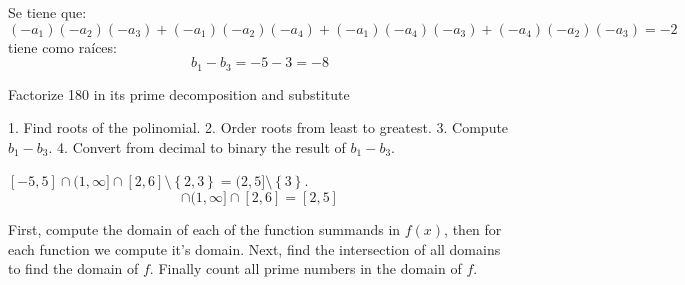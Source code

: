 \documentclass[12pt]{report}
\newcounter{it}
\theoremstyle{largebreak}
\begin{document}
    \begin{sol}
        Se tiene que:
        \begin{equation*}
            (-a_1)(-a_2)(-a_3)+(-a_1)(-a_2)(-a_4)+(-a_1)(-a_4)(-a_3)+(-a_4)(-a_2)(-a_3)=-2
        \end{equation*}
        tiene como raíces:
        \begin{equation*}
            b_1-b_3=-5-3=-8
        \end{equation*}

        Factorize 180 in its prime decomposition and substitute 

        1. Find roots of the polinomial.
        2. Order roots from least to greatest.
        3. Compute $b_1-b_3$.
        4. Convert from decimal to binary the result of $b_1-b_3$.

    \end{sol}

    \begin{sol}
        $[-5,5]\cap (1,\infty]\cap[2,6]\setminus\left\{2,3 \right\}=(2,5]\setminus\left\{3\right\}$.
        \begin{equation*}
            [-5,5]\cap (1,\infty]\cap[2,6]=[2,5]
        \end{equation*}
    \end{sol}

    First, compute the domain of each of the function summands in $f(x)$, then for each function we compute it's domain. Next, find the intersection of all domains to find the domain of $f$. Finally count all prime numbers in the domain of $f$.
\end{document}
